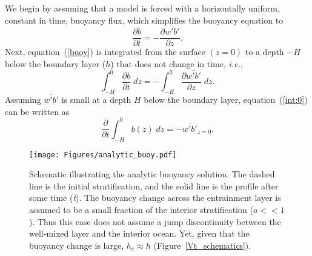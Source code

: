 \documentclass[preprint,12pt,authoryear]{agujournal}
\begin{document}
We begin by assuming that a model is forced with a horizontally uniform, constant in time, buoyancy flux, which simplifies the buoyancy equation to
\begin{equation} \label{buoy}
\frac{\partial b}{\partial t} = -\frac{\partial \overline{w'b'}}{\partial z}.
\end{equation}
Next, equation~(\ref{buoy}) is integrated from the surface $(z=0)$ to a depth $-H$ below the boundary layer ($h$) that does not change in time, \textit{i.e.}, 
\begin{equation} 
\label{int:0}
\int_{-H}^0 \frac{\partial b}{\partial t} \; dz = -\int_{-H}^0 \frac{\partial \overline{w'b'}}{\partial z} \; dz.
\end{equation}
Assuming $\overline{w'b'}$ is small at a depth $H$ below the boundary layer, equation~(\ref{int:0}) can be written as
\begin{equation} 
\label{int:1}
\frac{\partial}{\partial t} \int_{-H}^0 b(z) \; dz = -\overline{w'b'}_{z=0}.
\end{equation}

\begin{figure}[t]
\centering\texttt{[image: Figures/analytic\_buoy.pdf]}
\caption{Schematic illustrating the analytic buoyancy solution.  The dashed line is the initial stratification, and the solid line is the profile after some time (\textit{t}).  The buoyancy change across the entrainment layer is assumed to be a small fraction of the interior stratification ($a << 1$).  Thus this case does not assume a jump discontinuity between the well-mixed layer and the interior ocean.  Yet, given that the buoyancy change is large, $h_e \approx h$ (Figure~\ref{Vt_schematics}).}
\label{buoy_schematic}
\end{figure}
\end{document}

